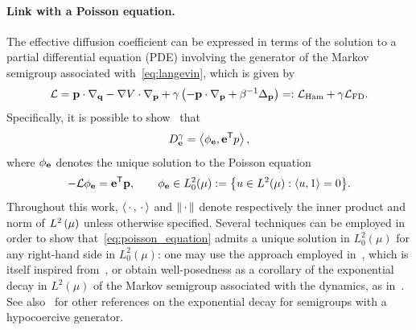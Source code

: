 \documentclass[11pt,a4paper]{article}
\begin{document}
\paragraph{Link with a Poisson equation.}
The effective diffusion coefficient
can be expressed in terms of the solution to a partial differential equation (PDE) involving the generator of the Markov semigroup associated with~\eqref{eq:langevin},
which is given by
\begin{equation}
    \label{eq:decomposition_generator}
    \mathcal L
    = \boldsymbol{\mathbf p} \cdot \nabla_{\boldsymbol{\mathbf q}} - \nabla V \cdot \nabla_{\boldsymbol{\mathbf p}} + \gamma \left( - \boldsymbol{\mathbf p} \cdot \nabla_{\boldsymbol{\mathbf p}} + \beta^{-1} \Delta_{\boldsymbol{\mathbf p}} \right)
    =: \mathcal L_{\rm Ham} + \gamma \mathcal L_{\rm FD}.
\end{equation}
Specifically, it is possible to show~\cite{MR663900} that
\begin{equation}
    \label{eq:effective_diffusion_poisson}
    D^{\gamma}_{\vect e} = \ip{\phi_{\vect e}}{\vect e^\t p},
\end{equation}
where $\phi_{\boldsymbol{\mathbf e}}$ denotes the unique solution to the Poisson equation
\begin{equation}
    \label{eq:poisson_equation}
    - \mathcal L \phi_{\vect e} = \vect e^\t \vect p,
    \qquad \phi_{\vect e} \in L^2_0(\mu) := \bigl\{ u \in L^2(\mu): \ip{u}{1} = 0 \bigr\}.
\end{equation}
Throughout this work,
$\ip{\dummy}{\dummy}$ and $\norm{\dummy}$ denote respectively the inner product and norm of $\lp{2}{\mu}$
unless otherwise specified.
Several techniques can be employed in order to show that~\eqref{eq:poisson_equation} admits a unique solution in $L^2_0(\mu)$
for any right-hand side in $L^2_0(\mu)$:
one may use the approach employed in~\cite[Proposition 5.1]{MR2793823},
which is itself inspired from~\cite[Lemma 2.1]{MR812349},
or obtain well-posedness as a corollary of the exponential decay in $L^2(\mu)$ of the Markov semigroup associated with the dynamics,
as in~\cite[Corollary 1]{roussel2018spectral}.
See also~\cite{Herau06,MR3106879,MR3522857,2020arXiv200300726B} for other references on the exponential decay for semigroups with a hypocoercive generator.
\end{document}
